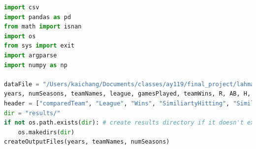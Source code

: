 \documentclass[12pt]{article}
\numberwithin{equation}{subsection}
\begin{document}
\bigskip
{}
\begin{lstlisting}[language=Python, caption=Similarity Algorithm]
import csv
import pandas as pd
from math import isnan
import os
from sys import exit
import argparse
import numpy as np
 
dataFile = "/Users/kaichang/Documents/classes/ay119/final_project/lahman-csv/Teams.csv"
years, numSeasons, teamNames, league, gamesPlayed, teamWins, R, AB, H, doubles, triples, HR, BB, SO, SB, CS, HBP, SF, ERA, IPouts, BBA, SOA, HRA, HA, CG, SHO, SV, FP, E, DP, BPF, PPF, ER, avg, sums = readDatabase(dataFile)
header = ["comparedTeam", "League", "Wins", "SimiliartyHitting", "SimilarityPitching","BABIP","wOBA","ERA","FIP","PBABIP","effERA"]
dir = "results/"
if not os.path.exists(dir): # create results directory if it doesn't exist already 
    os.makedirs(dir)
createOutputFiles(years, teamNames, numSeasons)


\end{lstlisting}
\end{document}
